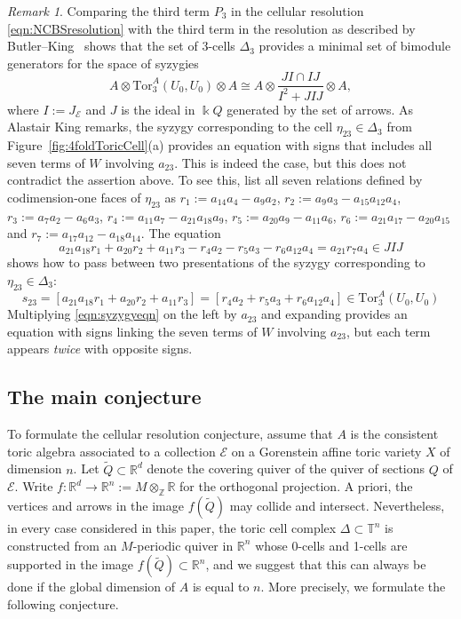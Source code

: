 \documentclass[11pt,a4paper]{amsart}
\numberwithin{equation}{section}
\theoremstyle{definition}
\theoremstyle{remark}
\newtheorem{remark}[theorem]{Remark}
\newcommand{\kk}{\ensuremath{\Bbbk}}
\newcommand{\RR}{\ensuremath{\mathbb{R}}}
\newcommand{\ZZ}{\ensuremath{\mathbb{Z}}}
\begin{document}
\begin{remark}
Comparing the third term $P_3$ in the cellular resolution \eqref{eqn:NCBSresolution} with the third term in the resolution as described by Butler--King~\cite[(1.1)]{ButlerKing} shows that the set of 3-cells $\Delta_3$ provides a minimal set of bimodule generators for the space of syzygies
\[
A\otimes\text{Tor}^A_3(U_0,U_0)\otimes A\cong A\otimes \frac{JI\cap IJ}{I^2+JIJ}\otimes A,
\]
where $I:=J_\mathscr{E}$ and $J$ is the ideal in $\kk Q$ generated by the set of  arrows. As Alastair King remarks, the syzygy corresponding to the cell $\eta_{23}\in \Delta_3$ from Figure~\ref{fig:4foldToricCell}(a) provides an equation with signs that includes all seven terms of $W$ involving $a_{23}$. This is indeed the case, but this does not contradict the assertion above.  To see this, list all seven relations defined by codimension-one faces of $\eta_{23}$ as $r_1 := a_{14}a_4 - a_9a_2$, $r_2 := a_9a_3 - a_{15}a_{12}a_4$, $r_3 := a_7a_2 - a_6a_3$, $r_4 := a_{11}a_7 - a_{21}a_{18}a_9$, $r_5 :=  a_{20}a_9-a_{11}a_6$, $r_6 := a_{21}a_{17}-a_{20}a_{15}$ and $r_7 := a_{17}a_{12} - a_{18}a_{14}$. The equation
\begin{equation}
\label{eqn:syzygyeqn}
a_{21}a_{18}r_1 + a_{20}r_2+a_{11}r_3  - r_4a_2 - r_5a_3 - r_6a_{12}a_4 = a_{21}r_7a_4\in JIJ
\end{equation}
shows how to pass between two presentations of the syzygy 
corresponding to $\eta_{23}\in \Delta_3$:
\[
s_{23} = [a_{21}a_{18}r_1 + a_{20}r_2+a_{11}r_3] = [r_4a_2 + r_5a_3 + r_6a_{12}a_4]\in \text{Tor}^A_3(U_0,U_0)
\] Multiplying \eqref{eqn:syzygyeqn} on the left by $a_{23}$ and expanding provides an equation with signs linking the seven terms of $W$ involving $a_{23}$, but each term appears \emph{twice} with opposite signs.
\end{remark}

\subsection{The main conjecture}
To formulate the cellular resolution conjecture, assume that $A$ is the consistent toric algebra associated to a collection $\mathscr{E}$ on a Gorenstein affine toric variety $X$ of dimension $n$. Let $\widetilde{Q}\subset \RR^d$ denote the covering quiver of the quiver of sections $Q$ of $\mathscr{E}$. Write $f\colon \RR^d\to \RR^n:=M\otimes_\ZZ \RR$ for the orthogonal projection. A priori, the vertices and arrows in the image $f(\widetilde{Q})$ may collide and intersect. Nevertheless, in every case considered in this paper, the toric cell complex $\Delta\subset \mathbb{T}^n$ is constructed from an $M$-periodic quiver in $\RR^n$ whose 0-cells and 1-cells are supported in the image $f(\widetilde{Q})\subset \RR^n$, and we suggest that this can always be done if the global dimension of $A$ is equal to $n$. More precisely, we formulate the following conjecture.
\end{document}
